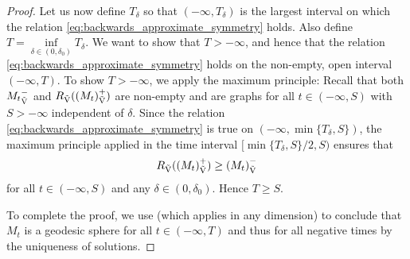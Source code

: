 \documentclass{amsart}
\theoremstyle{definition}
\theoremstyle{remark}
\numberwithin{equation}{section}
\begin{document}
\begin{proof}
Let us now define \(T_{\delta}\) so that \((-\infty, T_{\delta})\) is the largest interval on which the relation \eqref{eq:backwards_approximate_symmetry} holds. Also define \(T = \inf\limits_{\delta \in (0,\delta_0)} T_{\delta}\). We want to show that \(T > -\infty\), and hence that the relation \eqref{eq:backwards_approximate_symmetry} holds on the non-empty, open interval \((-\infty, T)\). To show $T>-\infty$, we apply the maximum principle: %
Recall that both \({M_t}_{\operatorname{\vec{V}}}^-\) and \(R_{\operatorname{\vec{V}}}({(M_t)}_{\operatorname{\vec{V}}}^+)\) are non-empty and are graphs for all \(t\in(-\infty, S)\) with \(S>-\infty\) independent of \(\delta\). Since the relation \eqref{eq:backwards_approximate_symmetry} is true on \((-\infty, \min\{T_{\delta},S\})\), the maximum principle applied in the time interval $[\min\{T_{\delta},S\}/2,S)$ ensures that
\begin{equation*}
\label{eq:longtime_approximate_symmetry}
R_{\operatorname{\vec{V}}}({(M_t)}_{\operatorname{\vec{V}}}^+) \geq {(M_t)}_{\operatorname{\vec{V}}}^-
\end{equation*}
for all \(t \in (-\infty, S)\) and any \(\delta \in (0,\delta_0)\). Hence $T\ge S.$

To complete the proof, we use \cite[Proposition 5.3]{Br-Lou} (which applies in any dimension) to conclude that \(M_t\) is a geodesic sphere for all \(t \in (-\infty, T)\) and thus for all negative times by the uniqueness of solutions.
\end{proof}

\end{document}
